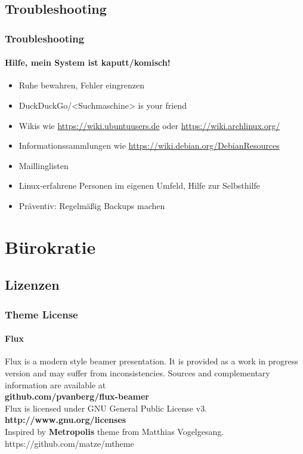 \documentclass[9pt]{beamer}
\begin{document}
\subsection{Troubleshooting}
\begin{frame}
 \frametitle{Troubleshooting}
 \framesubtitle{Hilfe, mein System ist kaputt/komisch!}
 \begin{Large}
 \begin{itemize}
  \item Ruhe bewahren, Fehler eingrenzen
  \item DuckDuckGo/<Suchmaschine> is your friend
  \item Wikis wie \href{https://wiki.ubuntuusers.de}{https://wiki.ubuntuusers.de} oder \href{https://wiki.archlinux.org/}{https://wiki.archlinux.org/} 
  \item Informationssammlungen wie \href{https://wiki.debian.org/DebianResources}{https://wiki.debian.org/DebianResources}
  \item Maillinglisten
  \item Linux-erfahrene Personen im eigenen Umfeld, Hilfe zur Selbsthilfe
  \item Präventiv: Regelmäßig Backups machen
 \end{itemize}
 \end{Large}
\end{frame}

\section{Bürokratie}

\subsection{Lizenzen}

\begin{frame}
 \centering
 \frametitle{Theme License}
 \framesubtitle{Flux}
 	\justifying
 Flux is a modern style beamer presentation. It is provided as a work in progress version and may suffer from inconsistencies. Sources and complementary information are available at\\[0.3cm]
 	\centering\textbf{github.com/pvanberg/flux-beamer}\\
 Flux is licensed under GNU General Public License v3.\\[0.3cm]
 	\centering\textbf{http://www.gnu.org/licenses}\\[0.3cm]
Inspired by \textbf{Metropolis} theme from Matthias Vogelgesang.\\
https://github.com/matze/mtheme 
 
\end{frame}
\end{document}

